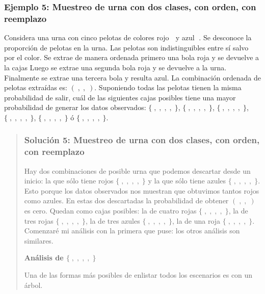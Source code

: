 \documentclass[
]{book}
\newenvironment{Ejemplo}
{\begin{mdframed}[
  linecolor=ejemplocolor,
  skipabove=12pt,
  skipbelow=12pt,
  roundcorner=20pt,
  splittopskip=2\topsep]}
{\end{mdframed}}
\begin{document}
\begin{Ejemplo}
\hypertarget{ejemplo-5-muestreo-de-urna-con-dos-clases-con-orden-con-reemplazo}{%
\subsubsection{Ejemplo 5: Muestreo de urna con dos clases, con orden,
con
reemplazo}\label{ejemplo-5-muestreo-de-urna-con-dos-clases-con-orden-con-reemplazo}}

Considera una urna con cinco pelotas de colores rojo 🔴 y azul 🔵. Se
desconoce la proporción de pelotas en la urna. Las pelotas son
indistinguibles entre sí salvo por el color. Se extrae de manera
ordenada primero una bola roja y se devuelve a la cajas Luego se extrae
una segunda bola roja y se devuelve a la urna. Finalmente se extrae una
tercera bola y resulta azul. La combinación ordenada de pelotas
extraídas es: \(( 🔴, 🔴, 🔵)\). Suponiendo todas las pelotas tienen la
misma probabilidad de salir, cuál de las siguientes cajas posibles tiene
una mayor probabilidad de generar los datos observados:
\(\{ 🔴, 🔴, 🔴, 🔴, 🔴\}\), \(\{ 🔴, 🔴, 🔴, 🔴, 🔵\}\), \(\{ 🔴, 🔴, 🔴, 🔵, 🔵\}\),
\(\{ 🔴, 🔴, 🔵, 🔵, 🔵\}\), \(\{ 🔴, 🔵, 🔵, 🔵, 🔵\}\) ó \(\{ 🔵, 🔵, 🔵, 🔵, 🔵\}\).

\begin{quote}
\hypertarget{soluciuxf3n-5-muestreo-de-urna-con-dos-clases-con-orden-con-reemplazo}{%
\subsubsection{Solución 5: Muestreo de urna con dos clases, con orden,
con
reemplazo}\label{soluciuxf3n-5-muestreo-de-urna-con-dos-clases-con-orden-con-reemplazo}}

Hay dos combinaciones de posible urna que podemos descartar desde un
inicio: la que sólo tiene rojos \(\{ 🔴, 🔴, 🔴, 🔴, 🔴\}\) y la que sólo
tiene azules \(\{ 🔵, 🔵, 🔵, 🔵, 🔵\}\). Esto porque los datos observados
nos muestran que obtuvimos tantos rojos como azules. En estas dos
descartadas la probabilidad de obtener \(( 🔴, 🔴, 🔵)\) es cero. Quedan
como cajas posibles: la de cuatro rojas \(\{ 🔴, 🔴, 🔴, 🔴, 🔵\}\), la de
tres rojas \(\{ 🔴, 🔴, 🔴, 🔵, 🔵\}\), la de tres azules
\(\{ 🔴, 🔴, 🔵, 🔵, 🔵\}\), la de una roja \(\{ 🔴, 🔵, 🔵, 🔵, 🔵\}\). Comenzaré
mi análisis con la primera que puse: los otros análisis son similares.

\textbf{Análisis de \(\{ 🔴, 🔴, 🔴, 🔴, 🔵\}\)}

Una de las formas más posibles de enlistar todos los escenarios es con
un árbol.
\end{quote}
\end{Ejemplo}
\end{document}
